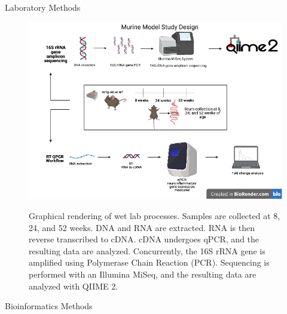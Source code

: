\documentclass[final]{beamer}
\newlength{\colwidth}
\begin{document}
\begin{frame}[t]
\begin{columns}[t]
\begin{column}{\colwidth}
\begin{block}{Laboratory Methods}
  \begin{figure}[tph!]
    {\includegraphics[width=.95\linewidth]{assets/lab_methods}}
    \caption{Graphical rendering of wet lab processes. Samples are collected
    at 8, 24, and 52 weeks. DNA and RNA are extracted. RNA is then reverse
    transcribed to cDNA. cDNA undergoes qPCR, and the resulting data are
    analyzed. Concurrently, the 16S rRNA gene is amplified using Polymerase
    Chain Reaction (PCR). Sequencing is performed with an Illumina MiSeq, and
    the resulting data are analyzed with QIIME 2.}
    \label{fig:lab_methods}
  \end{figure}


  \end{block}

  \begin{block}{Bioinformatics Methods}


\end{block}
\end{column}
\end{columns}
\end{frame}
\end{document}
